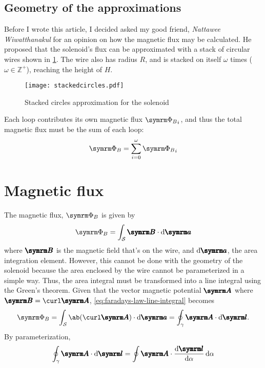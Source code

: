 \subsection{Geometry of the approximations}

Before I wrote this article, I decided asked my good friend, \emph{Nattawee Wiwatthanakul} for an opinion on how the magnetic flux may be calculated. He proposed that the solenoid's flux can be approximated with a stack of circular wires shown in \cref{fig:stacked-circles}. The wire also has radius $R$, and is stacked on itself $\omega$ times ($\omega \in \mathbb{Z}^+$), reaching the height of $H$.

\begin{figure}[ht]
	\centering
	\texttt{[image: stackedcircles.pdf]}
	\caption{Stacked circles approximation for the solenoid}
	\label{fig:stacked-circles}
\end{figure}

Each loop contributes its own magnetic flux ${\mflux}_i$, and thus the total magnetic flux must be the sum of each loop:
\begin{equation}
	\mflux = \sum_{i = 0}^{\omega}{\mflux}_i
\end{equation}

\section{Magnetic flux}

The magnetic flux, $\mflux$ is given by
\begin{equation}
	\mflux = \sint\vv{B}\cdot\odif{\vv{a}} \label{eq:faradays-law-line-integral}
\end{equation}
where $\vv{B}$ is the magnetic field that's on the wire, and $\odif{\vv{a}}$, the area integration element. However, this cannot be done with the geometry of the solenoid because the area enclosed by the wire cannot be parameterized in a simple way. Thus, the area integral must be transformed into a line integral using the Green's theorem. Given that the vector magnetic potential $\vv{A}$ where $\vv{B} = \curl\vv{A}$, \cref{eq:faradays-law-line-integral} becomes
\begin{equation}
	\mflux = \sint\ab(\curl\vv{A})\cdot\odif{\vv{a}} = \oint_{\gamma}\vv{A}\cdot\odif{\vv{l}}.
\end{equation}
By parameterization,
\begin{equation}
	\oint_{\gamma}\vv{A}\cdot\odif{\vv{l}} = \oint\vv{A}\cdot\odv{\vv{l}}{\alpha}\odif{\alpha}
\end{equation}
